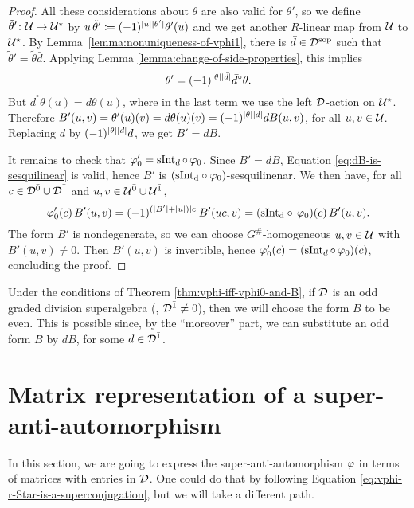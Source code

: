 \begin{proof}
    All these considerations about $\theta$ are also valid for $\theta'$, so we define $\tilde\theta'\colon \mathcal U \to \mathcal U^\star$ by $u\,\tilde\theta' \coloneqq (-1)^{|u||\theta'|} \theta'(u)$ and we get another $R$-linear map from $\mathcal U$ to $\mathcal U^\star$.
    By Lemma~\ref{lemma:nonuniqueness-of-vphi1}, there is $\bar d\in \mathcal{D}^{\mathrm{sop}}$ such that $\tilde\theta' = \tilde\theta \bar d$.
    Applying Lemma \ref{lemma:change-of-side-properties}, this implies \[\theta' = (-1)^{|\theta||\bar d|} \bar d^\circ \theta.\]
    But $\bar d^\circ \theta (u) = d\theta(u)$, where in the last term we use the left $\mathcal{D}$-action on $\mathcal U^\star$. 
    Therefore $B'(u,v) = \theta'(u)(v) = d\theta(u)(v) = (-1)^{|\theta||d|} dB(u, v)$, for all $u,v \in \mathcal U$. 
    Replacing $d$ by $(-1)^{|\theta||d|} d$, we get $B' = dB$. 
    
    It remains to check that $\varphi_0' = \operatorname{sInt}_d \circ\, \varphi_0$. 
    Since $B' = dB$, Equation \eqref{eq:dB-is-sesquilinear} is valid, hence $B'$ is $(\operatorname{sInt_d \circ \varphi_0})$-sesquilinenar.
    We then have, for all $c\in \mathcal{D}^{\bar0} \cup \mathcal{D}^{\bar1}$ and $u,v \in \mathcal U^{\bar0} \cup \mathcal U^{\bar1}$,
    \[
        \varphi_0'(c)\, B'(u,v) = (-1)^{(|B'| + |u|) |c|} B'(uc,v) = (\operatorname{sInt_d \circ\, \varphi_0}) (c)\, B'(u,v).
    \]
    The form $B'$ is nondegenerate, so we can choose $G^\#$-homogeneous $u,v\in \mathcal U$ with $B'(u,v)\neq 0$. Then $B'(u,v)$ is invertible, hence $\varphi_0' (c) = (\operatorname{sInt}_d \circ\, \varphi_0) (c)$, concluding the proof.
\end{proof}

\begin{convention}\label{conv:pick-even-form}
    Under the conditions of Theorem \ref{thm:vphi-iff-vphi0-and-B}, if $\mathcal{D}$ is an odd graded division superalgebra (\ie, $\mathcal{D}^{\bar1} \neq 0$), then we will choose the form $B$ to be even. 
    This is possible since, by the ``moreover'' part, we can substitute an odd form $B$ by $dB$, for some $d\in \mathcal{D}^{\bar1}$.
\end{convention}

\section{Matrix representation of a su\-per\--anti\--auto\-mor\-phism}

In this section, we are going to express the super-anti-automorphism $\varphi$ in terms of matrices with entries in $\mathcal{D}$. 
One could do that by following Equation \eqref{eq:vphi-r-Star-is-a-superconjugation}, but we will take a different path. 

